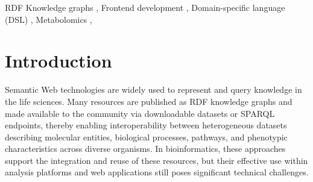 \documentclass[
]{ceurart}
\begin{document}
\begin{abstract}
Semantic Web technologies are widely used to integrate heterogeneous 
life science resources into RDF knowledge graphs exposed via SPARQL endpoints. 
Although graphical tools exist to help users compose SPARQL queries, leveraging 
these graphs within interactive web applications remains challenging for frontend 
developers. Existing solutions largely focus on data access and query execution, 
with limited support for application-oriented abstractions such as composable 
query builders or domain-specific languages tightly aligned with UI logic.

We present Unravel-RDF, a developer-oriented library available in the JavaScript ecosystem 
that introduces a focus-based domain-specific language (DSL) for constructing SPARQL
queries together with a composable API tailored to event-driven user
interfaces. Unravel-RDF offers functional abstractions for incremental
query construction, asynchronous execution, pagination,
while delegating query processing to existing SPARQL engines. We
evaluate Unravel-RDF in the FORVM ecosystem, which interconnects
biomedical and plant knowledge graphs through shared chemical
entities, and demonstrate a web application for cross-domain
exploration of metabolomics relationships across multiple SPARQL
endpoints. This case study suggests that Unravel-RDF can bring
knowledge graph querying closer to modern frontend development
practices and support the development of modular and responsive metabolomics
exploration tools.
\end{abstract}


\begin{keywords}
  RDF Knowledge graphs \sep
  Frontend development \sep
  Domain-specific language (DSL) \sep
  Metabolomics \sep
\end{keywords}

\maketitle

\section{Introduction}

Semantic Web technologies are widely used to represent and query knowledge in
the life sciences\citep{wu_semantic_2014}. Many resources are published as RDF
knowledge graphs and made available to the community via downloadable datasets
or SPARQL endpoints, thereby enabling interoperability between heterogeneous
datasets describing molecular entities, biological processes, pathways, and
phenotypic characteristics across diverse
organisms\citep{LODCloudLifeSciences}. In bioinformatics,
these approaches support the integration and reuse of these resources, but
their effective use within analysis platforms and web applications still poses
significant technical challenges.
\end{document}
